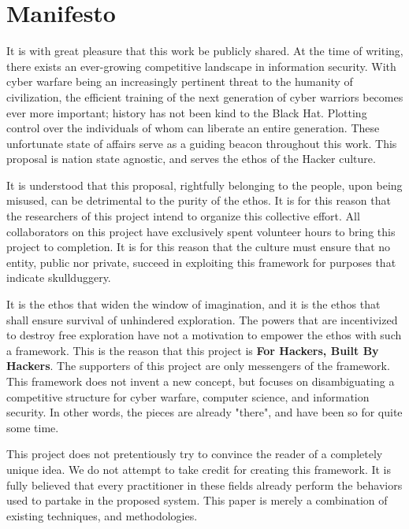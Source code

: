 \documentclass[10pt, titlepage, twocolumn]{article}
\begin{document}
%

\tableofcontents
\listoffigures
\listofalgorithms

\clearpage

\onecolumn
\section{Manifesto}
It is with great pleasure that this work be publicly shared. At the time of writing, there exists an ever-growing competitive landscape in information security. With cyber warfare being an increasingly pertinent threat to the humanity of civilization, the efficient training of the next generation of cyber warriors becomes ever more important; history has not been kind to the Black Hat. Plotting control over the individuals of whom can liberate an entire generation. These unfortunate state of affairs serve as a guiding beacon throughout this work. This proposal is nation state agnostic, and serves the ethos of the Hacker culture. 

It is understood that this proposal, rightfully belonging to the people, upon being misused, can be detrimental to the purity of the ethos. It is for this reason that the researchers of this project intend to organize this collective effort. All collaborators on this project have exclusively spent volunteer hours to bring this project to completion. It is for this reason that the culture must ensure that no entity, public nor private, succeed in exploiting this framework for purposes that indicate skullduggery.

It is the ethos that widen the window of imagination, and it is the ethos that shall ensure survival of unhindered exploration. The powers that are incentivized to destroy free exploration have not a motivation to empower the ethos with such a framework. This is the reason that this project is \textbf{For Hackers, Built By Hackers}. The supporters of this project are only messengers of the framework. This framework does not invent a new concept, but focuses on disambiguating a competitive structure for cyber warfare, computer science, and information security. In other words, the pieces are already "there", and have been so for quite some time. 

This project does not pretentiously try to convince the reader of a completely unique idea. We do not attempt to take credit for creating this framework. It is fully believed that every practitioner in these fields already perform the behaviors used to partake in the proposed system. This paper is merely a combination of existing techniques, and methodologies.
\end{document}
